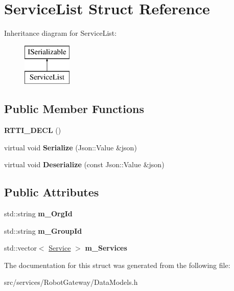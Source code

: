 \hypertarget{struct_service_list}{}\section{Service\+List Struct Reference}
\label{struct_service_list}
Inheritance diagram for Service\+List\+:\begin{figure}[H]
\begin{center}
\leavevmode
\includegraphics[height=2.000000cm]{struct_service_list}
\end{center}
\end{figure}
\subsection*{Public Member Functions}
\begin{DoxyCompactItemize}
\item 
\mbox{\label{struct_service_list_aedec3672dacb4b74c7a3f62a1b3be373}} 
{\bfseries R\+T\+T\+I\+\_\+\+D\+E\+CL} ()
\item 
\mbox{\label{struct_service_list_a5a79e97afe9c1563142e91122332cbd3}} 
virtual void {\bfseries Serialize} (Json\+::\+Value \&json)
\item 
\mbox{\label{struct_service_list_aae8c09af3bfce387d73d767abe1c894c}} 
virtual void {\bfseries Deserialize} (const Json\+::\+Value \&json)
\end{DoxyCompactItemize}
\subsection*{Public Attributes}
\begin{DoxyCompactItemize}
\item 
\mbox{\label{struct_service_list_a5a2affbb294eda04266c071fef6b1513}} 
std\+::string {\bfseries m\+\_\+\+Org\+Id}
\item 
\mbox{\label{struct_service_list_a01b4261449aa2ee2214b99ff5d7c49ba}} 
std\+::string {\bfseries m\+\_\+\+Group\+Id}
\item 
\mbox{\label{struct_service_list_abe84a52585192fe7ea3689efb9a4487b}} 
std\+::vector$<$ \hyperlink{struct_service}{Service} $>$ {\bfseries m\+\_\+\+Services}
\end{DoxyCompactItemize}


The documentation for this struct was generated from the following file\+:\begin{DoxyCompactItemize}
\item 
src/services/\+Robot\+Gateway/Data\+Models.\+h\end{DoxyCompactItemize}
